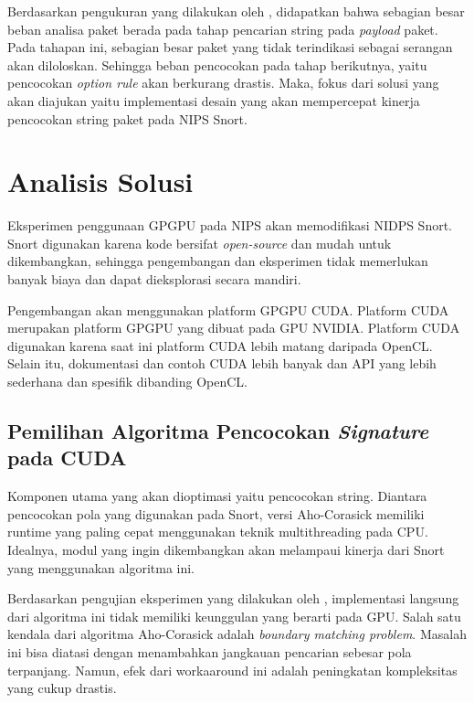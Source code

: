 
    Berdasarkan pengukuran yang dilakukan oleh \citep{kargus2012}, didapatkan bahwa sebagian besar beban analisa paket berada pada tahap pencarian string pada \emph{payload} paket. Pada tahapan ini, sebagian besar paket yang tidak terindikasi sebagai serangan akan diloloskan. Sehingga beban pencocokan pada tahap berikutnya, yaitu pencocokan \emph{option rule} akan berkurang drastis. Maka, fokus dari solusi yang akan diajukan yaitu implementasi desain yang akan mempercepat kinerja pencocokan string paket pada NIPS Snort.

  \section{Analisis Solusi}

    Eksperimen penggunaan GPGPU pada NIPS akan memodifikasi NIDPS Snort. Snort digunakan karena kode bersifat \emph{open-source} dan mudah untuk dikembangkan, sehingga pengembangan dan eksperimen tidak memerlukan banyak biaya dan dapat dieksplorasi secara mandiri. 

    Pengembangan akan menggunakan platform GPGPU CUDA. Platform CUDA merupakan platform GPGPU yang dibuat pada GPU NVIDIA. Platform CUDA digunakan karena saat ini platform CUDA lebih matang daripada OpenCL. Selain itu, dokumentasi dan contoh CUDA lebih banyak dan API yang lebih sederhana dan spesifik dibanding OpenCL.

    \subsection{Pemilihan Algoritma Pencocokan \emph{Signature} pada CUDA}

      Komponen utama yang akan dioptimasi yaitu pencocokan string. Diantara pencocokan pola yang digunakan pada Snort, versi Aho-Corasick memiliki runtime yang paling cepat menggunakan teknik multithreading pada CPU. Idealnya, modul yang ingin dikembangkan akan melampaui kinerja dari Snort yang menggunakan algoritma ini.
      
      Berdasarkan pengujian eksperimen yang dilakukan oleh \citep{lin2013}, implementasi langsung dari algoritma ini tidak memiliki keunggulan yang berarti pada GPU. Salah satu kendala dari algoritma Aho-Corasick adalah \emph{boundary matching problem}. Masalah ini bisa diatasi dengan menambahkan jangkauan pencarian sebesar pola terpanjang. Namun, efek dari workaaround ini adalah peningkatan kompleksitas yang cukup drastis. 
      
